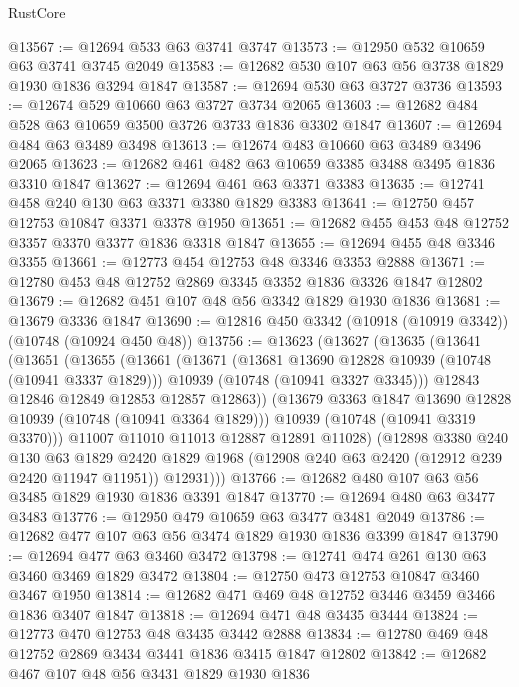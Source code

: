 \begin{lexlean}{RustCore}
\begin{coremodule}
@13567 := @12694 @533 @63 @3741 @3747
@13573 := @12950 @532 @10659 @63 @3741 @3745 @2049
@13583 := @12682 @530 @107 @63 @56 @3738 @1829 @1930 @1836 @3294 @1847
@13587 := @12694 @530 @63 @3727 @3736
@13593 := @12674 @529 @10660 @63 @3727 @3734 @2065
@13603 := @12682 @484 @528 @63 @10659 @3500 @3726 @3733 @1836 @3302 @1847
@13607 := @12694 @484 @63 @3489 @3498
@13613 := @12674 @483 @10660 @63 @3489 @3496 @2065
@13623 := @12682 @461 @482 @63 @10659 @3385 @3488 @3495 @1836 @3310 @1847
@13627 := @12694 @461 @63 @3371 @3383
@13635 := @12741 @458 @240 @130 @63 @3371 @3380 @1829 @3383
@13641 := @12750 @457 @12753 @10847 @3371 @3378 @1950
@13651 := @12682 @455 @453 @48 @12752 @3357 @3370 @3377 @1836 @3318 @1847
@13655 := @12694 @455 @48 @3346 @3355
@13661 := @12773 @454 @12753 @48 @3346 @3353 @2888
@13671 := @12780 @453 @48 @12752 @2869 @3345 @3352 @1836 @3326 @1847 @12802
@13679 := @12682 @451 @107 @48 @56 @3342 @1829 @1930 @1836
@13681 := @13679 @3336 @1847
@13690 := @12816 @450 @3342 (@10918 (@10919 @3342)) (@10748 (@10924 @450 @48))
@13756 := @13623
    (@13627
      (@13635
        (@13641
          (@13651
            (@13655
              (@13661
                (@13671
                  (@13681 @13690 @12828 @10939 (@10748 (@10941 @3337 @1829)))
                  @10939
                  (@10748 (@10941 @3327 @3345)))
                @12843
                @12846
                @12849
                @12853
                @12857
                @12863))
            (@13679 @3363 @1847 @13690 @12828 @10939 (@10748 (@10941 @3364 @1829)))
            @10939
            (@10748 (@10941 @3319 @3370)))
          @11007
          @11010
          @11013
          @12887
          @12891
          @11028)
        (@12898
          @3380
          @240
          @130
          @63
          @1829
          @2420
          @1829
          @1968
          (@12908 @240 @63 @2420 (@12912 @239 @2420 @11947 @11951))
          @12931)))
@13766 := @12682 @480 @107 @63 @56 @3485 @1829 @1930 @1836 @3391 @1847
@13770 := @12694 @480 @63 @3477 @3483
@13776 := @12950 @479 @10659 @63 @3477 @3481 @2049
@13786 := @12682 @477 @107 @63 @56 @3474 @1829 @1930 @1836 @3399 @1847
@13790 := @12694 @477 @63 @3460 @3472
@13798 := @12741 @474 @261 @130 @63 @3460 @3469 @1829 @3472
@13804 := @12750 @473 @12753 @10847 @3460 @3467 @1950
@13814 := @12682 @471 @469 @48 @12752 @3446 @3459 @3466 @1836 @3407 @1847
@13818 := @12694 @471 @48 @3435 @3444
@13824 := @12773 @470 @12753 @48 @3435 @3442 @2888
@13834 := @12780 @469 @48 @12752 @2869 @3434 @3441 @1836 @3415 @1847 @12802
@13842 := @12682 @467 @107 @48 @56 @3431 @1829 @1930 @1836

\end{coremodule}
\end{lexlean}
